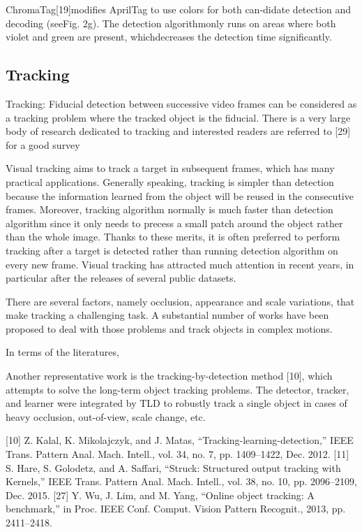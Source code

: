 \documentclass[a4paper]{report}
\begin{document}
ChromaTag[19]modifies AprilTag to use colors for both can-didate detection and decoding (seeFig. 2g). The detection algorithmonly runs on areas where both violet and green are present, whichdecreases the detection time significantly.


\subsection{Tracking}
Tracking: Fiducial detection between successive video
frames can be considered as a tracking problem where the
tracked object is the fiducial. There is a very large body
of research dedicated to tracking and interested readers are
referred to [29] for a good survey

Visual tracking aims to track a target in subsequent frames, which has many practical applications. Generally speaking, tracking is simpler than detection because the information learned from the object will be reused in the consecutive frames. Moreover, tracking algorithm normally is much faster than detection algorithm since it only needs to precess a small patch around the object rather than the whole image.
Thanks to these merits, it is often preferred to perform tracking after a target is detected rather than running detection algorithm on every new frame. Visual tracking has attracted much attention in recent years, in particular after the releases of several public datasets. 
 
There are several factors, namely occlusion, appearance and scale variations, that make tracking a challenging task. A substantial number of works have been proposed to deal with those problems and track objects in complex motions.


In terms of the literatures,

Another representative work is the tracking-by-detection method [10], which attempts to solve the long-term object tracking problems.
The detector, tracker, and learner were integrated by TLD to robustly track a single object in cases of heavy occlusion, out-of-view, scale change, etc. 


[10] Z. Kalal, K. Mikolajczyk, and J. Matas, “Tracking-learning-detection,”
IEEE Trans. Pattern Anal. Mach. Intell., vol. 34, no. 7, pp. 1409–1422,
Dec. 2012.
[11] S. Hare, S. Golodetz, and A. Saffari, “Struck: Structured output tracking
with Kernels,” IEEE Trans. Pattern Anal. Mach. Intell., vol. 38, no. 10,
pp. 2096–2109, Dec. 2015.
[27] Y. Wu, J. Lim, and M. Yang, “Online object tracking: A benchmark,” in
Proc. IEEE Conf. Comput. Vision Pattern Recognit., 2013, pp. 2411–2418.
\end{document}
